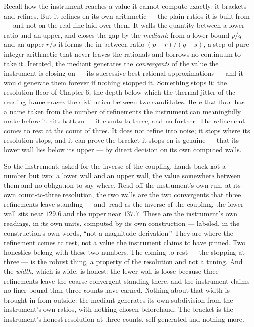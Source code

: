 Recall how the instrument reaches a value it cannot compute exactly: it brackets and refines. But it refines on its own
arithmetic --- the plain ratios it is built from --- and not on the real line laid over them. It walls the quantity between a
lower ratio and an upper, and closes the gap by the \emph{mediant}: from a lower bound $p/q$ and an upper $r/s$ it forms the
in-between ratio $(p+r)/(q+s)$, a step of pure integer arithmetic that never leaves the rationals and borrows no continuum to
take it. Iterated, the mediant generates the \emph{convergents} of the value the instrument is closing on --- its successive
best rational approximations --- and it would generate them forever if nothing stopped it. Something stops it: the resolution
floor of Chapter 6, the depth below which the thermal jitter of the reading frame erases the distinction between two
candidates. Here that floor has a name taken from the number of refinements the instrument can meaningfully make before it
hits bottom --- it counts to three, and no further. The refinement comes to rest at the count of three. It does not refine into
noise; it stops where its resolution stops, and it can prove the bracket it stops on is genuine --- that its lower wall lies
below its upper --- by direct decision on its own computed walls.

So the instrument, asked for the inverse of the coupling, hands back not a number but two: a lower wall and an upper wall,
the value somewhere between them and no obligation to say where. Read off the instrument's own run, at its own count-to-three
resolution, the two walls are the two convergents that three refinements leave standing --- and, read as the inverse of the
coupling, the lower wall sits near $129.6$ and the upper near $137.7$. These are the instrument's own readings, in its own
units, computed by its own construction --- labeled, in the construction's own words, ``not a magnitude derivation.'' They
are where the refinement comes to rest, not a value the instrument claims to have pinned. Two honesties belong with these two
numbers. The coming to rest --- the stopping at three --- is the robust thing, a property of the resolution and not a tuning. And the
\emph{width}, which is wide, is honest: the lower wall is loose because three refinements leave the coarse convergent
standing there, and the instrument claims no finer bound than three counts have earned. Nothing about that width is brought
in from outside: the mediant generates its own subdivision from the instrument's own ratios, with nothing chosen
beforehand. The bracket is the instrument's honest resolution at three counts, self-generated and nothing more.

